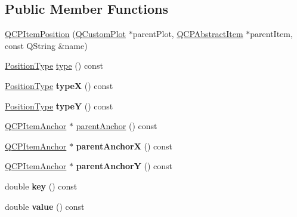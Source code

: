 \subsection*{Public Member Functions}
\begin{DoxyCompactItemize}
\item 
\hyperlink{classQCPItemPosition_a6519a552bd9766354644ec24d1f26622}{Q\+C\+P\+Item\+Position} (\hyperlink{classQCustomPlot}{Q\+Custom\+Plot} $\ast$parent\+Plot, \hyperlink{classQCPAbstractItem}{Q\+C\+P\+Abstract\+Item} $\ast$parent\+Item, const Q\+String \&name)
\item 
\hyperlink{classQCPItemPosition_aad9936c22bf43e3d358552f6e86dbdc8}{Position\+Type} \hyperlink{classQCPItemPosition_abfd74d86bd799306ce0295ffe433bdfc}{type} () const
\item 
\mbox{\label{classQCPItemPosition_a1415911868835701c04250566bfc681d}} 
\hyperlink{classQCPItemPosition_aad9936c22bf43e3d358552f6e86dbdc8}{Position\+Type} {\bfseries typeX} () const
\item 
\mbox{\label{classQCPItemPosition_ae47bac6f679c58f9e1c78dc63d56f331}} 
\hyperlink{classQCPItemPosition_aad9936c22bf43e3d358552f6e86dbdc8}{Position\+Type} {\bfseries typeY} () const
\item 
\hyperlink{classQCPItemAnchor}{Q\+C\+P\+Item\+Anchor} $\ast$ \hyperlink{classQCPItemPosition_a0a87f9dce1af6cc9b510785991bcf1c6}{parent\+Anchor} () const
\item 
\mbox{\label{classQCPItemPosition_a605cb8b2cf6044d3d03cb1a894faf98a}} 
\hyperlink{classQCPItemAnchor}{Q\+C\+P\+Item\+Anchor} $\ast$ {\bfseries parent\+AnchorX} () const
\item 
\mbox{\label{classQCPItemPosition_aa40afec791a4339b09572922ca425ec2}} 
\hyperlink{classQCPItemAnchor}{Q\+C\+P\+Item\+Anchor} $\ast$ {\bfseries parent\+AnchorY} () const
\item 
\mbox{\label{classQCPItemPosition_a6fc519f1b73722a8d0cff7d4d647407e}} 
double {\bfseries key} () const
\item 
\mbox{\label{classQCPItemPosition_acfcf86f840a7366a4299bff593d5d636}} 
double {\bfseries value} () const
\item 

\end{DoxyCompactItemize}
